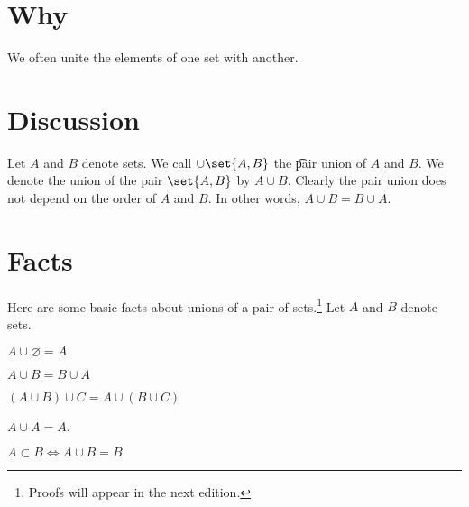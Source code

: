 
\section*{Why}

We often unite the elements of one set with another.

\section*{Discussion}

Let $A$ and $B$ denote sets.
We call $\cup \set{A, B}$ the \t{pair union} of $A$ and $B$.
We denote the union of the pair $\set{A, B}$ by $A \cup B$.
Clearly the pair union does not depend on the order of $A$ and $B$.
In other words, $A \cup B = B \cup A$.

\section*{Facts}

Here are some basic facts about unions of a pair of sets.\footnote{Proofs will appear in the next edition.}
Let $A$ and $B$ denote sets.

\begin{proposition}

\label{pair_unions:identity_element}$A \cup \varnothing = A$
\end{proposition}

\begin{proposition}[Commutativity]
$A \cup B = B \cup A$
\end{proposition}

\begin{proposition}[Commutativity]
$(A \cup B) \cup C = A \cup (B \cup C)$
\end{proposition}

\begin{proposition}[Idempotence]
$A \cup A = A$.
\end{proposition}

\begin{proposition}
$A \subset B \iff A \cup B = B$
\end{proposition}

\blankpage